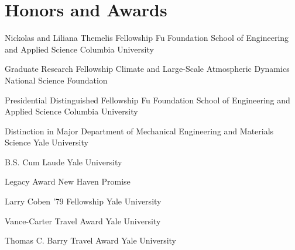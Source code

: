\section{Honors and Awards}

{Nickolas and Liliana Themelis Fellowship}
{Fu Foundation School of Engineering and Applied Science}
{Columbia University}
{}
{}

{Graduate Research Fellowship}
{Climate and Large-Scale Atmospheric Dynamics}
{National Science Foundation}
{}
{}

{Presidential Distinguished Fellowship}
{Fu Foundation School of Engineering and Applied Science}
{Columbia University}
{}
{}

{Distinction in Major}
{Department of Mechanical Engineering and Materials Science}
{Yale University}
{}
{}

{B.S. Cum Laude}
{}
{Yale University}
{}
{}

{Legacy Award}
{}
{New Haven Promise}
{}
{}
{}

{Larry Coben '79 Fellowship}
{}
{Yale University}
{}
{}

{Vance-Carter Travel Award}
{}
{Yale University}
{}
{}

{Thomas C. Barry Travel Award}
{}
{Yale University}
{}
{}
